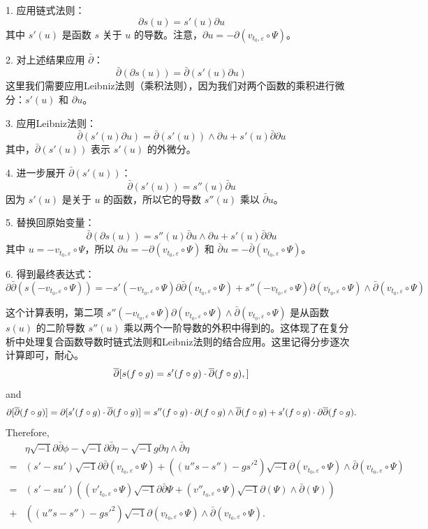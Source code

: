 1. 应用链式法则：
   \[
   \partial s(u) = s'(u) \partial u
   \]
   其中 \(s'(u)\) 是函数 \(s\) 关于 \(u\) 的导数。注意，\(\partial u = -\partial(v_{t_0,\varepsilon} \circ \Psi)\)。

2. 对上述结果应用 \(\bar{\partial}\)：
   \[
   \bar{\partial}(\partial s(u)) = \bar{\partial}(s'(u) \partial u)
   \]
   这里我们需要应用Leibniz法则（乘积法则），因为我们对两个函数的乘积进行微分：\(s'(u)\) 和 \(\partial u\)。

3. 应用Leibniz法则：
   \[
   \bar{\partial}(s'(u) \partial u) = \bar{\partial}(s'(u)) \wedge \partial u + s'(u) \bar{\partial}\partial u
   \]
   其中，\(\bar{\partial}(s'(u))\) 表示 \(s'(u)\) 的外微分。

4. 进一步展开 \(\bar{\partial}(s'(u))\)：
   \[
   \bar{\partial}(s'(u)) = s''(u) \bar{\partial}u
   \]
   因为 \(s'(u)\) 是关于 \(u\) 的函数，所以它的导数 \(s''(u)\) 乘以 \(\bar{\partial}u\)。

5. 替换回原始变量：
   \[
   \bar{\partial}(\partial s(u)) = s''(u) \bar{\partial}u \wedge \partial u + s'(u) \bar{\partial}\partial u
   \]
   其中 \(u = -v_{t_0,\varepsilon} \circ \Psi\)，所以 \(\partial u = -\partial(v_{t_0,\varepsilon} \circ \Psi)\) 和 \(\bar{\partial}u = -\bar{\partial}(v_{t_0,\varepsilon} \circ \Psi)\)。

6. 得到最终表达式：
   \[
   \partial\bar{\partial}(s(-v_{t_0,\varepsilon} \circ \Psi)) = -s'(-v_{t_0,\varepsilon} \circ \Psi) \partial\bar{\partial}(v_{t_0,\varepsilon} \circ \Psi) + s''(-v_{t_0,\varepsilon} \circ \Psi) \partial(v_{t_0,\varepsilon} \circ \Psi) \wedge \bar{\partial}(v_{t_0,\varepsilon} \circ \Psi)
   \]

这个计算表明，第二项 \(s''(-v_{t_0,\varepsilon} \circ \Psi) \partial(v_{t_0,\varepsilon} \circ \Psi) \wedge \bar{\partial}(v_{t_0,\varepsilon} \circ \Psi)\) 是从函数 \(s(u)\) 的二阶导数 \(s''(u)\) 乘以两个一阶导数的外积中得到的。这体现了在复分析中处理复合函数导数时链式法则和Leibniz法则的结合应用。这里记得分步逐次计算即可，耐心。
\[\overline{\partial}[s(f\circ g)=s'(f\circ g)\cdot \overline{\partial}(f\circ g),]\]
and
\[\partial[\overline{\partial}(f\circ g)]=\partial[s'(f\circ g)\cdot \overline{\partial}(f\circ g)]=s''(f\circ g)\cdot \partial(f\circ g)\wedge \overline{\partial} (f\circ g)+s'(f\circ g)\cdot \partial\overline{\partial}(f\circ g).\]
Therefore,
\begin{equation}
\label{equ:smooth.vector1}
\begin{split}
&\eta\sqrt{-1}\partial\bar\partial\phi-\sqrt{-1}\partial\bar\partial\eta-
\sqrt{-1}g\partial\eta\wedge\bar\partial\eta
\\=&(s'-su')\sqrt{-1}\partial\bar{\partial}(v_{t_0,\varepsilon}\circ \Psi)
+((u''s-s'')-gs'^{2})\sqrt{-1}\partial(v_{t_0,\varepsilon}\circ \Psi)
\wedge\bar{\partial}(v_{t_0,\varepsilon}\circ \Psi)
\\=&
(s'-su')((v'_{t_0,\varepsilon}\circ\Psi)\sqrt{-1}\partial\bar{\partial}
\Psi+(v''_{t_0,\varepsilon}\circ \Psi)\sqrt{-1}\partial(\Psi)\wedge\bar{\partial}(\Psi))
\\+&((u''s-s'')-gs'^{2})\sqrt{-1}\partial(v_{t_0,\varepsilon}\circ \Psi)
\wedge\bar{\partial}(v_{t_0,\varepsilon}\circ \Psi).
\end{split}
\end{equation}

